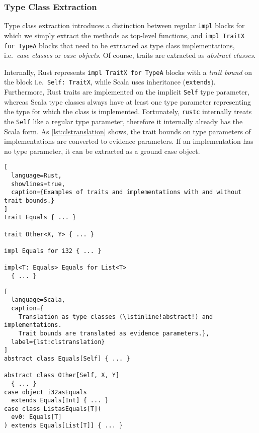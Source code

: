\subsubsection{Type Class Extraction}

Type class extraction introduces a distinction between regular
\passthrough{\lstinline!impl!} blocks for which we simply extract the
methods as top-level functions, and
\passthrough{\lstinline!impl TraitX for TypeA!} blocks that need to be
extracted as type class implementations, i.e.~\emph{case classes} or
\emph{case objects}. Of course, traits are extracted as \emph{abstract
classes}.

Internally, Rust represents
\passthrough{\lstinline!impl TraitX for TypeA!} blocks with a
\emph{trait bound} on the block
i.e.~\passthrough{\lstinline!Self: TraitX!}, while Scala uses
inheritance (\passthrough{\lstinline!extends!}). Furthermore, Rust
traits are implemented on the implicit \passthrough{\lstinline!Self!}
type parameter, whereas Scala type classes always have at least one type
parameter representing the type for which the class is implemented.
Fortunately, \passthrough{\lstinline!rustc!} internally treats the
\passthrough{\lstinline!Self!} like a regular type parameter, therefore
it internally already has the Scala form. As \autoref{lst:clstranslation}
shows, the trait bounds on type parameters of implementations are
converted to evidence parameters. If an implementation has no type
parameter, it can be extracted as a ground case object.

\noindent
\begin{minipage}[t]{.49\textwidth}
\begin{lstlisting}[
  language=Rust,
  showlines=true,
  caption={Examples of traits and implementations with and without trait bounds.}
]
trait Equals { ... }

trait Other<X, Y> { ... }

impl Equals for i32 { ... }

impl<T: Equals> Equals for List<T>
  { ... }

\end{lstlisting}
\end{minipage}\hfill
\begin{minipage}[t]{.49\textwidth}
\begin{lstlisting}[
  language=Scala,
  caption={
    Translation as type classes (\lstinline!abstract!) and implementations.
    Trait bounds are translated as evidence parameters.},
  label={lst:clstranslation}
]
abstract class Equals[Self] { ... }

abstract class Other[Self, X, Y]
  { ... }
case object i32asEquals
  extends Equals[Int] { ... }
case class ListasEquals[T](
  ev0: Equals[T]
) extends Equals[List[T]] { ... }
\end{lstlisting}
\end{minipage}

